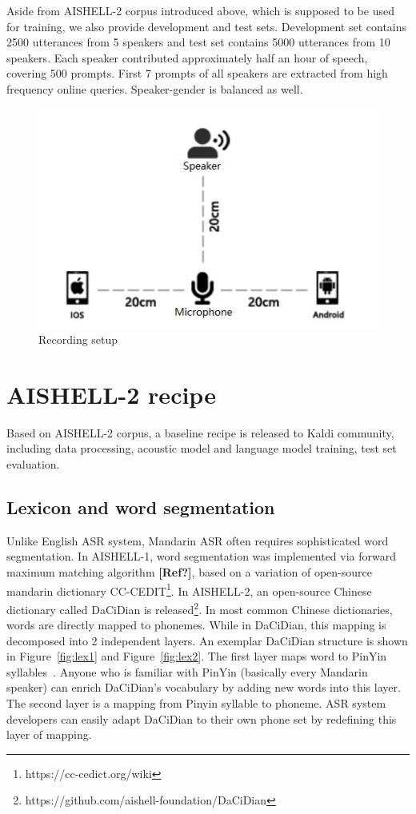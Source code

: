 \documentclass[a4paper]{article}
\begin{document}
\noindent Aside from AISHELL-2 corpus introduced above, which is supposed to be used for training, 
we also provide development and test sets. 
Development set contains 2500 utterances from 5 speakers and test set contains 5000 utterances from 10 speakers. 
Each speaker contributed approximately half an hour of speech, covering 500 prompts. 
First 7 prompts of all speakers are extracted from high frequency online queries. Speaker-gender is balanced as well.


\begin{figure}[h]
  \centering
  \includegraphics[width=\linewidth]{setup.jpg}
  \caption{Recording setup}
  \label{fig:setup}
\end{figure}

\section{AISHELL-2 recipe}

Based on AISHELL-2 corpus, a baseline recipe is released to Kaldi community, including
data processing, acoustic model and language model training, test set evaluation.

\subsection{Lexicon and word segmentation}

Unlike English ASR system, Mandarin ASR often requires sophisticated word segmentation. 
In AISHELL-1, word segmentation was implemented via forward
maximum matching algorithm \textbf{[Ref?]}, based on a variation of open-source mandarin
dictionary CC-CEDIT\footnote{https://cc-cedict.org/wiki}. In AISHELL-2, an
open-source Chinese dictionary called DaCiDian is
released\footnote{https://github.com/aishell-foundation/DaCiDian}. In most
common Chinese dictionaries, words are directly mapped to phonemes. While in
DaCiDian, this mapping is decomposed into 2 independent layers. An exemplar
DaCiDian structure is shown in Figure~\ref{fig:lex1} and Figure~\ref{fig:lex2}. The first layer maps word to PinYin syllables~\cite{pinyin}. Anyone who is
  familiar with PinYin (basically every Mandarin speaker) can enrich DaCiDian's
  vocabulary by adding new words into this layer. The second layer is a mapping from Pinyin syllable to phoneme. ASR system
  developers can easily adapt DaCiDian to their own phone set by redefining this
  layer of mapping.
\end{document}
